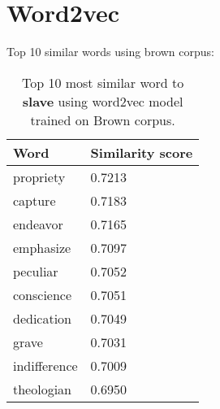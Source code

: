 \section{Word2vec}

Top 10 similar words using brown corpus:


\begin{table}[h!]
    \centering
    \begin{tabular}{|l|l|}
        \hline
        Word & Similarity score \\
        \hline
        propriety & 0.7213 \\
        capture & 0.7183 \\
        endeavor & 0.7165 \\
        emphasize & 0.7097 \\
        peculiar & 0.7052 \\
        conscience & 0.7051 \\
        dedication & 0.7049 \\
        grave & 0.7031 \\
        indifference & 0.7009 \\
        theologian & 0.6950 \\
        \hline
    \end{tabular}
    \caption{Top 10 most similar word to \textbf{slave} using word2vec model trained on Brown corpus.}
    \label{tab:slave_brown}
\end{table}


